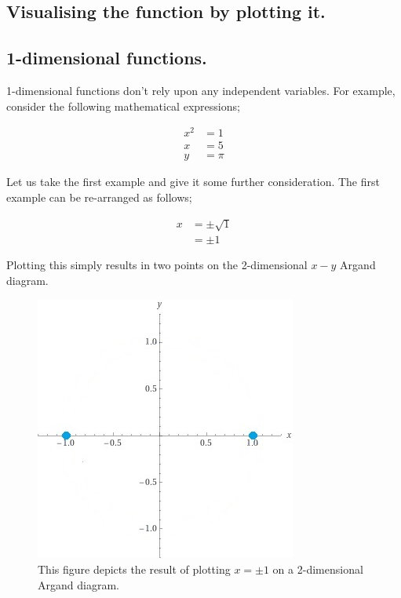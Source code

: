 \documentclass{article}
\begin{document}
\subsection{Visualising the function by plotting it.}




\subsection{1-dimensional functions.}

1-dimensional functions don't rely upon any independent variables. For example, consider the following
mathematical expressions;

\begin{align*}
x^{2} &= 1 \\
x     &= 5 \\
y     &= \pi
\end{align*}

Let us take the first example and give it some further consideration. The first example can be re-arranged
as follows;

\begin{align*}
x &= \pm\sqrt{1} \\
  &= \pm1
\end{align*}

Plotting this simply results in two points on the 2-dimensional $x-y$ Argand diagram.

\begin{figure}
  \includegraphics[scale=1.5]{images/Plus_and_minus_one.jpg}
  \caption{This figure depicts the result of plotting $x = \pm1$ on a 2-dimensional Argand diagram.}
  \label{fig:Plus_and_minus_one}
\end{figure}
\end{document}
